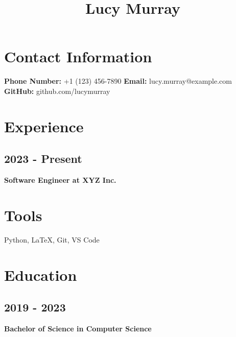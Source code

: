 \documentclass{article}%
\title{Lucy Murray}%
\begin{document}
%
\normalsize%
\maketitle%
\section{Contact Information}%
\label{sec:ContactInformation}%
\textbf{Phone Number: }%
+1 (123) 456{-}7890\newline%
%
\textbf{Email: }%
lucy.murray@example.com\newline%
%
\textbf{GitHub: }%
github.com/lucymurray

%
\section{Experience}%
\label{sec:Experience}%
\subsection{2023 {-} Present}%
\label{subsec:2023{-}Present}%
\textbf{Software Engineer at XYZ Inc.}

%
\section{Tools}%
\label{sec:Tools}%
Python, LaTeX, Git, VS Code

%
\section{Education}%
\label{sec:Education}%
\subsection{2019 {-} 2023}%
\label{subsec:2019{-}2023}%
\textbf{Bachelor of Science in Computer Science}

%
\end{document}
